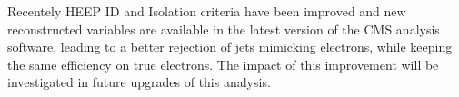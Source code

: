 Recentely HEEP ID and Isolation criteria have been improved
and new reconstructed variables are available in the latest version 
of the CMS analysis software, 
leading to a better rejection of jets mimicking electrons, 
while keeping the same efficiency on true electrons. 
The impact of this improvement will be investigated in 
future upgrades of this analysis. 





